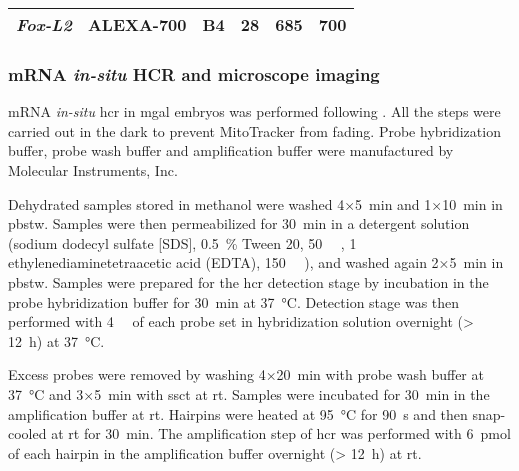 {\begin{longtable}[c]{llcccc}
    \textit{Fox-L2}                                              & ALEXA-700                                                        & B4                                                               & 28                                                                                     & 685                                                                                    & 700                                                                                 \\* \bottomrule \bottomrule
\end{longtable}
}

\subsubsection{mRNA \textit{in-situ} HCR and microscope imaging}
mRNA \textit{in-situ} \gls{hcr} in \gls{mgal} embryos was performed following . All the steps were carried out in the dark to prevent MitoTracker from fading. Probe hybridization buffer, probe wash buffer and amplification buffer were manufactured by Molecular Instruments, Inc.

Dehydrated samples stored in methanol were washed 4×\qty{5}{\minute} and 1×\qty{10}{\minute} in \gls{pbstw}. Samples were then permeabilized for \qty{30}{\minute} in a detergent solution (\onepercent sodium dodecyl sulfate [SDS], \qty{0.5}{\percent} Tween 20, \qty{50}{\milli\molar} , \qty{1}{\milli\molar} ethylenediaminetetraacetic acid (EDTA), \qty{150}{\milli\molar} ), and washed again 2×\qty{5}{\minute} in \gls{pbstw}. Samples were prepared for the \gls{hcr} detection stage by incubation in the probe hybridization buffer for \qty{30}{\minute} at \qty{37}{\degreeCelsius}. Detection stage was then performed with \qty{4}{\nano\molar} of each probe set in hybridization solution overnight (\qty{> 12}{\hour}) at \qty{37}{\degreeCelsius}.

Excess probes were removed by washing 4×\qty{20}{\minute} with probe wash buffer at \qty{37}{\degreeCelsius} and 3×\qty{5}{\minute} with \gls{ssct} at \gls{rt}. Samples were incubated for \qty{30}{\minute} in the amplification buffer at \gls{rt}. Hairpins were heated at \qty{95}{\degreeCelsius} for \qty{90}{\second} and then snap-cooled at \gls{rt} for \qty{30}{\minute}. The amplification step of \gls{hcr} was performed with \qty{6}{\pmol} of each hairpin in the amplification buffer overnight (\qty{> 12}{\hour}) at \gls{rt}.

